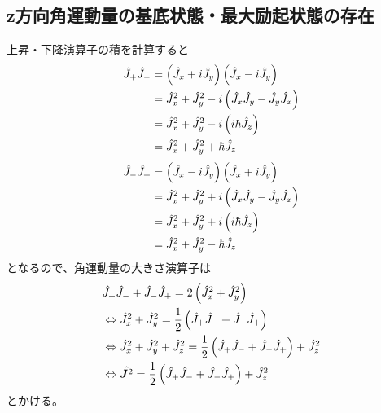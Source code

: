 \documentclass{jsarticle}  %
\numberwithin{equation}{section} %
\numberwithin{figure}{section}
\begin{document}
\subsection{z方向角運動量の基底状態・最大励起状態の存在}
    上昇・下降演算子の積を計算すると
    \begin{align}
        \hat{J}_+ \hat{J}_- &= \left( \hat{J}_x + i\hat{J}_y \right) \left( \hat{J}_x - i\hat{J}_y \right) \notag \\
        &= \hat{J}_x^2 + \hat{J}_y^2 - i\left( \hat{J}_x \hat{J}_y - \hat{J}_y \hat{J}_x \right) \notag \\
        &= \hat{J}_x^2 + \hat{J}_y^2 - i\left( i\hbar \hat{J}_z \right) \notag \\
        &= \hat{J}_x^2 + \hat{J}_y^2 + \hbar \hat{J}_z 
    \end{align}
    \begin{align}
        \hat{J}_- \hat{J}_+ &= \left( \hat{J}_x - i\hat{J}_y \right) \left( \hat{J}_x + i\hat{J}_y \right) \notag \\
        &= \hat{J}_x^2 + \hat{J}_y^2 + i\left( \hat{J}_x \hat{J}_y - \hat{J}_y \hat{J}_x \right) \notag \\
        &= \hat{J}_x^2 + \hat{J}_y^2 + i\left( i\hbar \hat{J}_z \right) \notag \\
        &= \hat{J}_x^2 + \hat{J}_y^2 - \hbar \hat{J}_z 
    \end{align}
    となるので、角運動量の大きさ演算子は
    \begin{align}
        &\hat{J}_+ \hat{J}_- + \hat{J}_- \hat{J}_+ = 2\left( \hat{J}_x^2 + \hat{J}_y^2 \right) \notag \\
        &\Leftrightarrow \hat{J}_x^2 + \hat{J}_y^2 = \frac{1}{2} \left( \hat{J}_+ \hat{J}_- + \hat{J}_- \hat{J}_+ \right) \notag \\
        &\Leftrightarrow \hat{J}_x^2 + \hat{J}_y^2 + \hat{J}_z^2 = \frac{1}{2} \left( \hat{J}_+ \hat{J}_- + \hat{J}_- \hat{J}_+ \right) + \hat{J}_z^2 \notag \\
        &\Leftrightarrow \hat{\bm{J}^2} = \frac{1}{2} \left( \hat{J}_+ \hat{J}_- + \hat{J}_- \hat{J}_+ \right) + \hat{J}_z^2
    \end{align}
    とかける。\\
\end{document}
